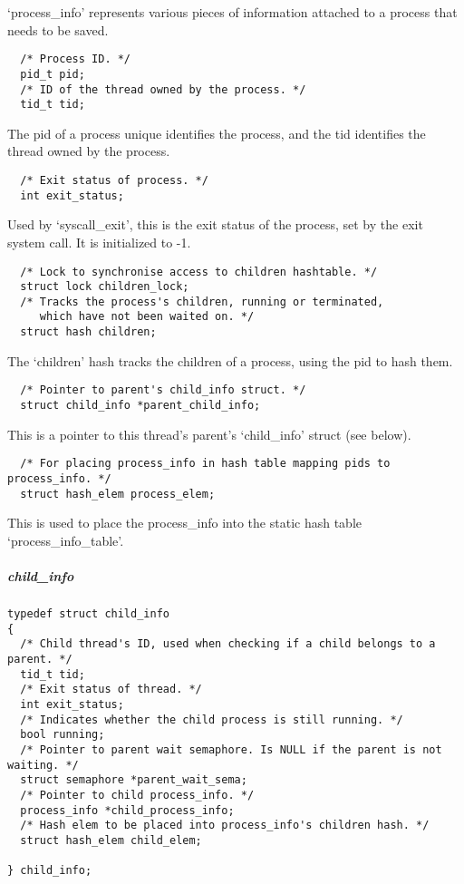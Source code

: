 `process\_info' represents various pieces of information attached to a process
that needs to be saved.

\begin{verbatim}
  /* Process ID. */
  pid_t pid;
  /* ID of the thread owned by the process. */
  tid_t tid;
\end{verbatim}

The pid of a process unique identifies the process, and the tid identifies the
thread owned by the process.

\begin{verbatim}
  /* Exit status of process. */
  int exit_status;
\end{verbatim}

Used by `syscall\_exit', this is the exit status of the process, set by the exit
system call. It is initialized to -1.

\begin{verbatim}
  /* Lock to synchronise access to children hashtable. */
  struct lock children_lock;
  /* Tracks the process's children, running or terminated,
     which have not been waited on. */
  struct hash children;
\end{verbatim}

The `children' hash tracks the children of a process, using the pid to hash
them.

\begin{verbatim}
  /* Pointer to parent's child_info struct. */
  struct child_info *parent_child_info;
\end{verbatim}

This is a pointer to this thread's parent's `child\_info' struct (see below).

\begin{verbatim}
  /* For placing process_info in hash table mapping pids to process_info. */
  struct hash_elem process_elem;
\end{verbatim}

This is used to place the process\_info into the static hash table
`process\_info\_table'.

\subparagraph{child\_info}

\begin{verbatim}
typedef struct child_info
{
  /* Child thread's ID, used when checking if a child belongs to a parent. */
  tid_t tid;
  /* Exit status of thread. */
  int exit_status;
  /* Indicates whether the child process is still running. */
  bool running;
  /* Pointer to parent wait semaphore. Is NULL if the parent is not waiting. */
  struct semaphore *parent_wait_sema;
  /* Pointer to child process_info. */
  process_info *child_process_info;
  /* Hash elem to be placed into process_info's children hash. */
  struct hash_elem child_elem;

} child_info;
\end{verbatim}

